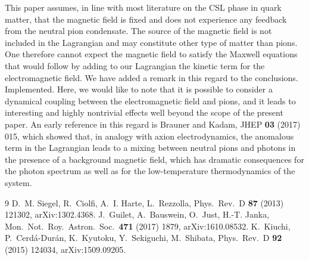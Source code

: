 \documentclass[11pt,a4paper]{article}
\newcommand{\impl}{\textcolor{green!60!black}{Implemented.}}
\newcommand{\reply}{\par\medskip\noindent{\sffamily\large Reply:}\par\smallskip\noindent}
\begin{document}
\reply
This paper assumes, in line with most literature on the CSL phase in quark matter, that the magnetic field is fixed and does not experience any feedback from the neutral pion condensate. The source of the magnetic field is not included in the Lagrangian and may constitute other type of matter than pions. One therefore cannot expect the magnetic field to satisfy the Maxwell equations that would follow by adding to our Lagrangian the kinetic term for the electromagnetic field. We have added a remark in this regard to the conclusions. \impl{} Here, we would like to note that it is possible to consider a dynamical coupling between the electromagnetic field and pions, and it leads to interesting and highly nontrivial effects well beyond the scope of the present paper. An early reference in this regard is Brauner and Kadam, JHEP \textbf{03} (2017) 015, which showed that, in analogy with axion electrodynamics, the anomalous term in the Lagrangian leads to a mixing between neutral pions and photons in the presence of a background magnetic field, which has dramatic consequences for the photon spectrum as well as for the low-temperature thermodynamics of the system.

\begin{thebibliography}{9}\small
{} D.~M. Siegel, R.~Ciolfi, A.~I. Harte, L.~Rezzolla, Phys.\ Rev.\ D \textbf{87} (2013) 121302, arXiv:1302.4368.
 J.~Guilet, A.~Bauswein, O.~Just, H.-T. Janka, Mon.\ Not.\ Roy.\ Astron.\ Soc.\ \textbf{471} (2017) 1879, arXiv:1610.08532.
 K.~Kiuchi, P.~Cerd\'a-Dur\'an, K.~Kyutoku, Y.~Sekiguchi, M.~Shibata, Phys.\ Rev.\ D \textbf{92} (2015) 124034, arXiv:1509.09205.
\end{thebibliography}
\end{document}
